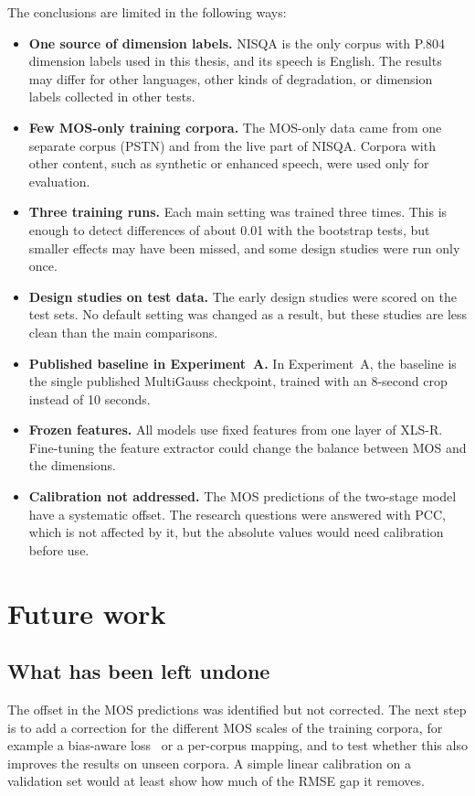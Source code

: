 \documentclass[
english,                 %
bibtex,                  %
includeExtraAbstracts, %
]{kththesis}
\numberwithin{listing}{chapter}
\begin{document}
The conclusions are limited in the following ways:
\begin{itemize}
\item \textbf{One source of dimension labels.} NISQA is the only corpus with P.804 dimension labels used in this thesis, and its speech is English. The results may differ for other languages, other kinds of degradation, or dimension labels collected in other tests.
\item \textbf{Few MOS-only training corpora.} The MOS-only data came from one separate corpus (PSTN) and from the live part of NISQA. Corpora with other content, such as synthetic or enhanced speech, were used only for evaluation.
\item \textbf{Three training runs.} Each main setting was trained three times. This is enough to detect differences of about 0.01 with the bootstrap tests, but smaller effects may have been missed, and some design studies were run only once.
\item \textbf{Design studies on test data.} The early design studies were scored on the test sets. No default setting was changed as a result, but these studies are less clean than the main comparisons.
\item \textbf{Published baseline in Experiment~A.} In Experiment~A, the baseline is the single published MultiGauss checkpoint, trained with an 8-second crop instead of 10 seconds.
\item \textbf{Frozen features.} All models use fixed features from one layer of XLS-R. Fine-tuning the feature extractor could change the balance between MOS and the dimensions.
\item \textbf{Calibration not addressed.} The MOS predictions of the two-stage model have a systematic offset. The research questions were answered with PCC, which is not affected by it, but the absolute values would need calibration before use.
\end{itemize}

\section{Future work}
\label{sec:futureWork}

\subsection{What has been left undone}

The offset in the MOS predictions was identified but not corrected. The next step is to add a correction for the different MOS scales of the training corpora, for example a bias-aware loss~\cite{mittag_biasaware_2021} or a per-corpus mapping, and to test whether this also improves the results on unseen corpora. A simple linear calibration on a validation set would at least show how much of the RMSE gap it removes.
\end{document}
